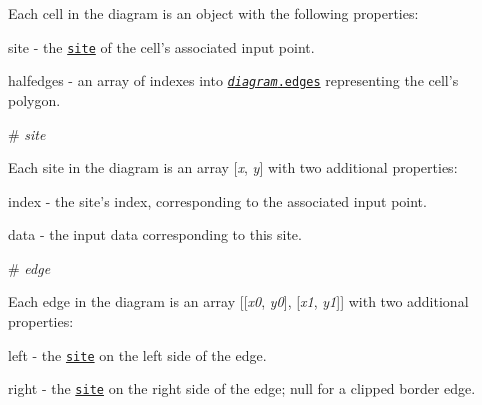 Each cell in the diagram is an object with the following properties\+:


\begin{DoxyItemize}
\item {\ttfamily site} -\/ the \href{#site}{\tt site} of the cell’s associated input point.
\item {\ttfamily halfedges} -\/ an array of indexes into \href{#diagram}{\tt {\itshape diagram}.edges} representing the cell’s polygon.
\end{DoxyItemize}

\label{_site}%
\# {\itshape site}

Each site in the diagram is an array \mbox{[}{\itshape x}, {\itshape y}\mbox{]} with two additional properties\+:


\begin{DoxyItemize}
\item {\ttfamily index} -\/ the site’s index, corresponding to the associated input point.
\item {\ttfamily data} -\/ the input data corresponding to this site.
\end{DoxyItemize}

\label{_edge}%
\# {\itshape edge}

Each edge in the diagram is an array \mbox{[}\mbox{[}{\itshape x0}, {\itshape y0}\mbox{]}, \mbox{[}{\itshape x1}, {\itshape y1}\mbox{]}\mbox{]} with two additional properties\+:


\begin{DoxyItemize}
\item {\ttfamily left} -\/ the \href{#site}{\tt site} on the left side of the edge.
\item {\ttfamily right} -\/ the \href{#site}{\tt site} on the right side of the edge; null for a clipped border edge. 
\end{DoxyItemize}